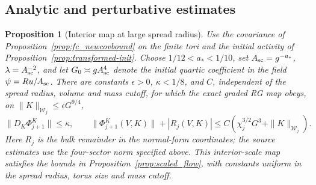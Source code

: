 \documentclass[11pt]{article}
\newtheorem{proposition}{Proposition}[section]
\begin{document}
\subsection{Analytic and perturbative estimates}

\begin{proposition}[Interior map at large spread radius]
\label{prop:map_matching}
Use the covariance of Proposition~\ref{prop:fc_newcovbound}
on the finite tori and the initial activity of
Proposition~\ref{prop:transformed-init}. Choose
\(1/12<a_*<1/10\), set \(A_{\rm sc}=g^{-a_*}\),
\(\lambda=A_{\rm sc}^{-2}\), and let
\(G_0\asymp gA_{\rm sc}^4\) denote the initial quartic
coefficient in the field \(\psi=Ru/A_{\rm sc}\).
There are constants \(\epsilon>0\), \(\kappa<1/8\), and \(C\),
independent of the spread radius, volume and mass cutoff, for which
the exact graded RG map obeys, on \(\|K\|_{\mathcal W_j}\le
\epsilon G^{9/4}\),
\[
 \|D_K\Phi^K_{j+1}\|\le\kappa,\qquad
 \|\Phi^K_{j+1}(V,K)\|+|R_j(V,K)|
 \le C(\chi_j^{3/2}G^3+\|K\|_{\mathcal W_j}).
\]
Here \(R_j\) is the bulk remainder in the normal-form coordinates;
the source estimates use the four-sector norm specified above.
This interior-scale map satisfies
the bounds in Proposition~\ref{prop:scaled_flow},
with constants uniform in the spread radius, torus size and
mass cutoff.
\end{proposition}
\end{document}
